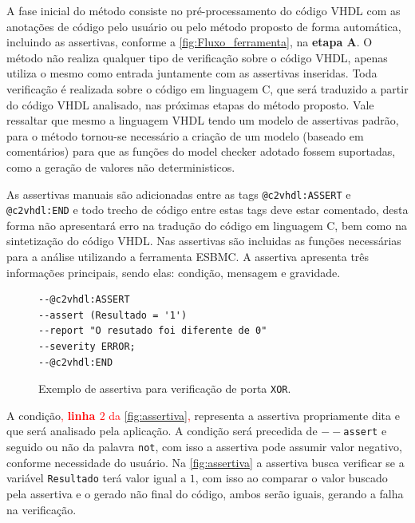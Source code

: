 \par
A fase inicial do método consiste no pré-processamento do código VHDL com as anotações de código pelo usuário ou pelo método proposto de forma automática, incluindo as assertivas, conforme a \autoref{fig:Fluxo_ferramenta}, na \textbf{etapa A}. O método não realiza qualquer tipo de verificação sobre o código VHDL, apenas utiliza o mesmo como entrada juntamente com as assertivas inseridas. Toda verificação é realizada sobre o código em linguagem C, que será traduzido a partir do código VHDL analisado, nas próximas etapas do método proposto. Vale ressaltar que mesmo a linguagem VHDL tendo um modelo de assertivas padrão, para o método tornou-se necessário a criação de um modelo (baseado em comentários) para que as funções do model checker adotado fossem suportadas, como a geração de valores não deterministicos.

\par
\label{sec:assertiva_descricao} As assertivas manuais são adicionadas entre as tags \texttt{@c2vhdl:ASSERT} e \texttt{@c2vhdl:END} e todo trecho de código entre estas tags deve estar comentado, desta forma não apresentará erro na tradução do código em linguagem C, bem como na sintetização do código VHDL. Nas assertivas são incluidas as funções necessárias para a análise utilizando a ferramenta ESBMC. A assertiva apresenta três informações principais, sendo elas: condição, mensagem e gravidade.

\begin{figure}[H]
\caption{\label{fig:assertiva} Exemplo de assertiva para verificação de porta \texttt{XOR}.}
	\begin{center}
    \begin{minipage}{0.99\textwidth}
    \begin{lstlisting}       
--@c2vhdl:ASSERT
--assert (Resultado = '1')
--report "O resutado foi diferente de 0"
--severity ERROR;
--@c2vhdl:END
    \end{lstlisting}
    \end{minipage}
	\end{center}
\end{figure}

\par
A condição\textcolor{red}{, \textbf{linha $2$} da \autoref{fig:assertiva},} representa a assertiva propriamente dita e que será analisado pela aplicação. A condição será precedida de \texttt{$--$assert} e seguido ou não da palavra \texttt{not}, com isso a assertiva pode assumir valor negativo, conforme necessidade do usuário. Na \autoref{fig:assertiva} a assertiva busca verificar se a variável \texttt{Resultado} terá valor igual a $1$, com isso ao comparar o valor buscado pela assertiva e o gerado não final do código, ambos serão iguais, gerando a falha na verificação.


